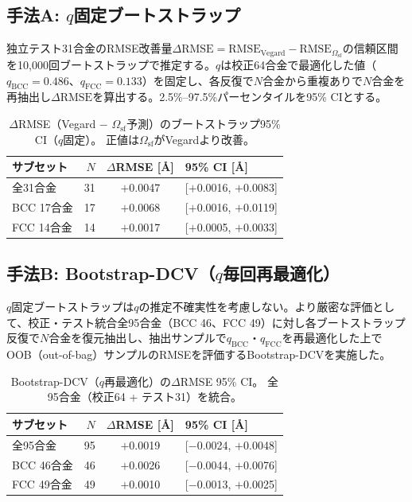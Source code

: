 \documentclass[5p,10pt]{elsarticle}
\begin{document}
\subsection{手法A: $q$固定ブートストラップ}

独立テスト31合金のRMSE改善量$\Delta\text{RMSE} = \text{RMSE}_\text{Vegard} - \text{RMSE}_{\Omega_\text{sf}}$の信頼区間を10,000回ブートストラップで推定する。$q$は校正64合金で最適化した値（$q_\text{BCC} = 0.486$、$q_\text{FCC} = 0.133$）を固定し、各反復で$N$合金から重複ありで$N$合金を再抽出し$\Delta\text{RMSE}$を算出する。2.5\%--97.5\%パーセンタイルを95\% CIとする。

\begin{table}[H]
\centering
\caption{$\Delta$RMSE（Vegard $-$ $\Omega_\text{sf}$予測）のブートストラップ95\% CI（$q$固定）。
  正値は$\Omega_\text{sf}$がVegardより改善。}
\label{tab:bootstrap_all}
\footnotesize
\begin{tabular}{@{}lrcl@{}}
\toprule
サブセット & $N$ & $\Delta$RMSE [\AA] & 95\% CI [\AA] \\
\midrule
全31合金 & 31 & $+$0.0047 & [$+$0.0016, $+$0.0083] \\
BCC 17合金 & 17 & $+$0.0068 & [$+$0.0016, $+$0.0119] \\
FCC 14合金 & 14 & $+$0.0017 & [$+$0.0005, $+$0.0033] \\
\bottomrule
\end{tabular}
\end{table}

\subsection{手法B: Bootstrap-DCV（$q$毎回再最適化）}

$q$固定ブートストラップは$q$の推定不確実性を考慮しない。より厳密な評価として、校正・テスト統合全95合金（BCC 46、FCC 49）に対し各ブートストラップ反復で$N$合金を復元抽出し、抽出サンプルで$q_\text{BCC}$・$q_\text{FCC}$を再最適化した上でOOB（out-of-bag）サンプルのRMSEを評価するBootstrap-DCVを実施した。

\begin{table}[H]
\centering
\caption{Bootstrap-DCV（$q$再最適化）の$\Delta$RMSE 95\% CI。
  全95合金（校正64 + テスト31）を統合。}
\label{tab:bootstrap_dcv}
\footnotesize
\begin{tabular}{@{}lrcl@{}}
\toprule
サブセット & $N$ & $\Delta$RMSE [\AA] & 95\% CI [\AA] \\
\midrule
全95合金 & 95 & $+$0.0019 & [$-$0.0024, $+$0.0048] \\
BCC 46合金 & 46 & $+$0.0026 & [$-$0.0044, $+$0.0076] \\
FCC 49合金 & 49 & $+$0.0010 & [$-$0.0013, $+$0.0025] \\
\bottomrule
\end{tabular}
\end{table}
\end{document}
